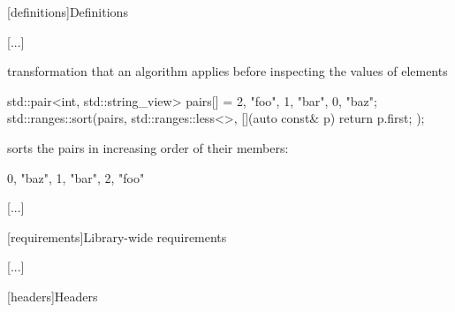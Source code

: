 \setcounter{section}{2}
[definitions]{Definitions}

[...]

\begin{addedblock}
\setcounter{subsection}{17}
%
 transformation that
an algorithm applies before inspecting the values of elements

\begin{example}
\begin{codeblock}
std::pair<int, std::string_view> pairs[] = {{2, "foo"}, {1, "bar"}, {0, "baz"}};
std::ranges::sort(pairs, std::ranges::less<>{}, [](auto const& p) { return p.first; });
\end{codeblock}
sorts the pairs in increasing order of their  members:
\begin{codeblock}
{{0, "baz"}, {1, "bar"}, {2, "foo"}}
\end{codeblock}
\end{example}
\end{addedblock}

[...]

\setcounter{section}{4}
[requirements]{Library-wide requirements}

[...]

\setcounter{subsection}{1}
\setcounter{subsubsection}{1}
[headers]{Headers}

